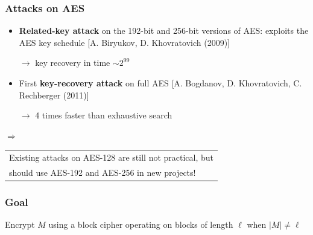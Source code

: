 \documentclass[aspectratio=169, lualatex, handout, 10pt,dvipsnames,svgnames]{beamer} %
\def\enrouge#1{\textcolor{rouge}{#1}}
\begin{document}
\begin{frame}

  \frametitle{Attacks on AES}

  \begin{itemize}
  \item {\bf Related-key attack} on the 192-bit and 256-bit versions of AES: exploits the AES key schedule [A. Biryukov, D. Khovratovich (2009)]

    \enrouge{$\longrightarrow$ key recovery in time $\sim 2^{99}$}
    \bigskip{}

  \item First {\bf key-recovery attack} on full AES [A. Bogdanov, D. Khovratovich, C. Rechberger (2011)]

    \enrouge{$\longrightarrow$ 4 times faster than exhaustive search}
  \end{itemize}
  \pause
  \bigskip{}

  \enrouge{$\Rightarrow$
    \begin{tabular}[t]{l}
      Existing attacks on AES-128 are still not practical, but \\
      should use AES-192 and AES-256 in new projects!
    \end{tabular}
  }

\end{frame}

\date{}
\author{}

\begin{frame}
  \maketitle
\end{frame}

\begin{frame}
  \frametitle{Goal}

  \begin{block}{}
    Encrypt $M$ using a block cipher operating on blocks of length $\ell$ when \enrouge{$|M|\not=\ell$}
  \end{block}
\end{frame}
\end{document}
